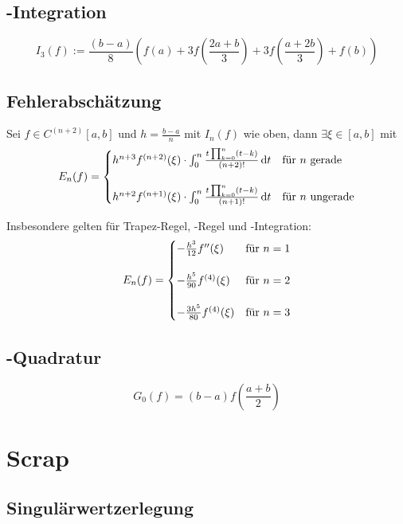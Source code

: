 \section{\protect{}-Integration}

\[ I_{3}(f):=\frac{(b-a)}{8}\left(f(a)+3f\left(\frac{2a+b}{3}\right)+3f\left(\frac{a+2b}{3}\right)+f(b)\right) \]



\section{Fehlerabschätzung}

Sei $f\in C^{(n+2)}[a,b]$ und $h=\frac{b-a}{n}$ mit $I_{n}(f)$ wie oben, dann $\exists\xi\in[a,b]$ mit 
\[
  E_{n}(f) = \begin{cases}
    h^{n+3} f^{(n+2)}(\xi) \cdot \int_0^n \frac{t\prod_{k=0}^{n}(t-k)}{(n+2)!} \,\mathrm{d} t & \hbox{für $n$ gerade}\\
    \\
    h^{n+2} f^{(n+1)}(\xi) \cdot \int_0^n \frac{t\prod_{k=0}^{n}(t-k)}{(n+1)!} \,\mathrm{d} t & \hbox{für $n$ ungerade}
  \end{cases}
\]


Insbesondere gelten für Trapez-Regel, -Regel und -Integration:
\[
  E_{n}(f) = \begin{cases}
    -\frac{h^3}{12}f''(\xi)      & \hbox{für $n=1$}\\
    \\
    -\frac{h^5}{90}f^{(4)}(\xi)  & \hbox{für $n=2$}\\
    \\
    -\frac{3h^5}{80}f^{(4)}(\xi) & \hbox{für $n=3$}
  \end{cases}
\]



\section{\protect{}-Quadratur}

\[ G_0(f)=(b-a)f \left(\frac{a+b}{2}\right) \]



\chapter{Scrap}


\section{Singulärwertzerlegung}

